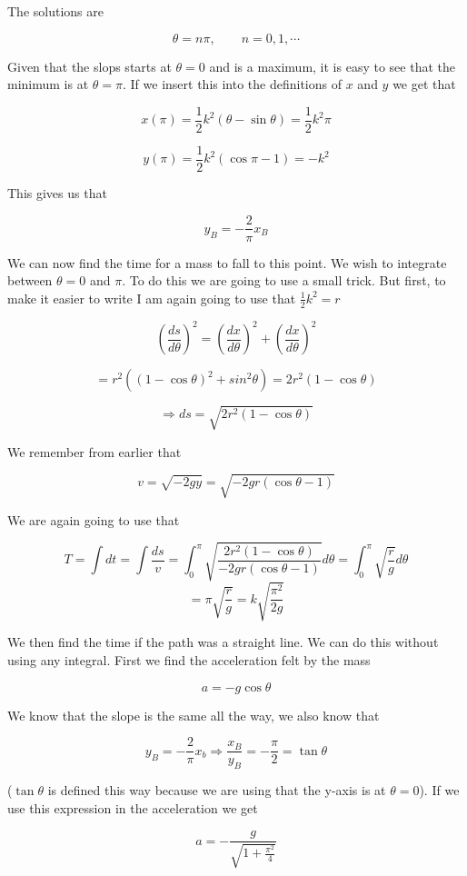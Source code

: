 \documentclass[a4paper,norsk, 10pt]{article}
\begin{document}
The solutions are 

$$
\theta = n\pi , \qquad n = 0,1,  \cdots
$$

Given that the slops starts at $\theta = 0$ and is a maximum, it is easy to see that the minimum is at $\theta = \pi$. If we insert this into the definitions of $x$ and $y$ we get that

$$
x(\pi) = \frac{1}{2}k^2(\theta - \sin\theta) = \frac{1}{2}k^2 \pi
$$

$$
y(\pi) = \frac{1}{2}k^2(\cos\pi - 1) = -k^2
$$

This gives us that

$$
y_B = -\frac{2}{\pi}x_B
$$

We can now find the time for a mass to fall to this point. We wish to integrate between $\theta = 0$ and $\pi$. To do this we are going to use a small trick. But first, to make it easier to write I am again going to use that $\frac{1}{2}k^2 = r$

$$
\left(\frac{ds}{d\theta}\right)^2= \left(\frac{dx}{d\theta}\right)^2 + \left(\frac{dx}{d\theta}\right)^2
$$

$$
= r^2((1-\cos\theta)^2 + sin^2\theta) = 2r^2(1-\cos\theta)
$$

$$
\Rightarrow ds = \sqrt{2r^2(1-\cos\theta)}
$$

We remember from earlier that 

$$
v = \sqrt{-2gy} = \sqrt{-2gr(\cos\theta-1)}
$$

We are again going to use that

$$
T = \int dt = \int \frac{ds}{v} = \int_{0}^{\pi} \sqrt{\frac{2r^2(1-\cos\theta)}{-2gr(\cos\theta-1)}} d\theta = \int_{0}^{\pi} \sqrt{\frac{r}{g}} d\theta 
$$
$$
= \pi \sqrt{\frac{r}{g}} =  k\sqrt{\frac{\pi^2}{2g}}
$$

We then find the time if the path was a straight line. We can do this without using any integral. First we find the acceleration felt by the mass

$$
a = -g\cos\theta
$$

We know that the slope is the same all the way, we also know that 

$$
y_B = -\frac{2}{\pi}x_b \Rightarrow \frac{x_B}{y_B} = -\frac{\pi}{2} = \tan\theta 
$$

($\tan\theta$ is defined this way because we are using that the y-axis is at $\theta = 0$). If we use this expression in the acceleration we get

$$
a = -\frac{g}{\sqrt{1+\frac{\pi^2}{4}}}
$$
\end{document}
